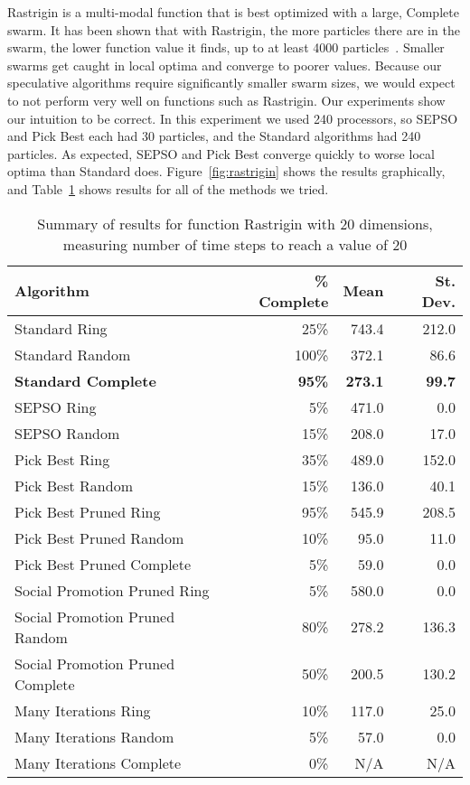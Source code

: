 \documentclass[smallcondensed]{svjour3}
\newcommand{\fig}[1]{Figure~\ref{fig:#1}}
\newcommand{\tabref}[1]{Table~\ref{tab:#1}}
\begin{document}
Rastrigin is a multi-modal function that is best optimized with a large,
Complete swarm.  It has been shown that with Rastrigin, the more particles
there are in the swarm, the lower function value it finds, up to at least 4000
particles~\citep{mcnabb-2009-large-particle-swarms}.  Smaller swarms get caught
in local optima and converge to poorer values.  Because our speculative
algorithms require significantly smaller swarm sizes, we would expect to not
perform very well on functions such as Rastrigin.  Our experiments show our
intuition to be correct.  In this experiment we used 240 processors, so SEPSO
and Pick Best each had 30 particles, and the Standard algorithms had 240
particles.  As expected, SEPSO and Pick Best converge quickly to worse local
optima than Standard does.  \fig{rastrigin} shows the results graphically, and
\tabref{rastrigin-20} shows results for all of the methods we tried.

\begin{table}
  \caption{Summary of results for function Rastrigin with 20 dimensions,
  measuring number of time steps to reach a value of 20}
  \label{tab:rastrigin-20}
  \centering
  \begin{tabular}{|l|r|r|r|}
  \hline
  Algorithm&\% Complete&Mean&St. Dev.\\
  \hline
  \hline
  Standard Ring&25\%&743.4&212.0\\
  \hline
  Standard Random&100\%&372.1&86.6\\
  \hline
  \textbf{Standard Complete}&\textbf{95\%}&\textbf{273.1}&\textbf{99.7}\\
  \hline
  SEPSO Ring&5\%&471.0&0.0\\
  \hline
  SEPSO Random&15\%&208.0&17.0\\
  \hline
  Pick Best Ring&35\%&489.0&152.0\\
  \hline
  Pick Best Random&15\%&136.0&40.1\\
  \hline
  Pick Best Pruned Ring&95\%&545.9&208.5\\
  \hline
  Pick Best Pruned Random&10\%&95.0&11.0\\
  \hline
  Pick Best Pruned Complete&5\%&59.0&0.0\\
  \hline
  Social Promotion Pruned Ring&5\%&580.0&0.0\\
  \hline
  Social Promotion Pruned Random&80\%&278.2&136.3\\
  \hline
  Social Promotion Pruned Complete&50\%&200.5&130.2\\
  \hline
  Many Iterations Ring&10\%&117.0&25.0\\
  \hline
  Many Iterations Random&5\%&57.0&0.0\\
  \hline
  Many Iterations Complete&0\%&N/A&N/A\\
  \hline
  \end{tabular}
\end{table}
\end{document}
